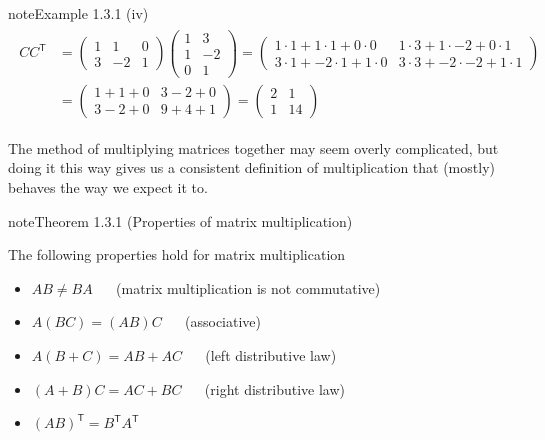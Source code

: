 \documentclass[letterpaper,10pt,english]{jupyterBook}
\begin{document}
\begin{sphinxadmonition}{note}{Example 1.3.1}
\sphinxAtStartPar
(iv)
\begin{equation*}
\begin{split}\begin{align*}
    CC^\mathsf{T} &=
    \begin{pmatrix} 1 & 1 & 0 \\ 3 & -2 & 1 \end{pmatrix}
    \begin{pmatrix} 1 & 3 \\ 1 & -2 \\ 0 & 1 \end{pmatrix}
    =
    \begin{pmatrix}
        1 \cdot 1 + 1 \cdot 1 + 0 \cdot 0 & 1 \cdot 3 + 1 \cdot -2 + 0 \cdot 1 \\
        3 \cdot 1 + -2 \cdot 1 + 1 \cdot 0 & 3 \cdot 3 + -2 \cdot -2 + 1 \cdot 1
    \end{pmatrix} \\
    &=
    \begin{pmatrix}
        1 + 1 + 0 & 3 - 2 + 0 \\
        3 - 2 + 0 & 9 + 4 + 1
    \end{pmatrix}
    =
    \begin{pmatrix}
        2 & 1 \\
        1 & 14
    \end{pmatrix}
\end{align*} \end{split}
\end{equation*}\end{sphinxadmonition}

\sphinxAtStartPar
The method of multiplying matrices together may seem overly complicated, but doing it this way gives us a consistent definition of multiplication that (mostly) behaves the way we expect it to.
\label{_pages/1.2_Matrix_multiplication:theorem-2}
\begin{sphinxadmonition}{note}{Theorem 1.3.1 (Properties of matrix multiplication)}



\sphinxAtStartPar
The following properties hold for matrix multiplication
\begin{itemize}
\item {} 
\sphinxAtStartPar
\(AB \neq BA\)   (matrix multiplication is not commutative)

\item {} 
\sphinxAtStartPar
\(A(BC) = (AB)C\)   (associative)

\item {} 
\sphinxAtStartPar
\(A(B + C) = AB + AC\)   (left distributive law)

\item {} 
\sphinxAtStartPar
\((A + B)C = AC + BC\)   (right distributive law)

\item {} 
\sphinxAtStartPar
\((AB)^\mathsf{T} = B^\mathsf{T}A^\mathsf{T}\)

\end{itemize}
\end{sphinxadmonition}
\end{document}
